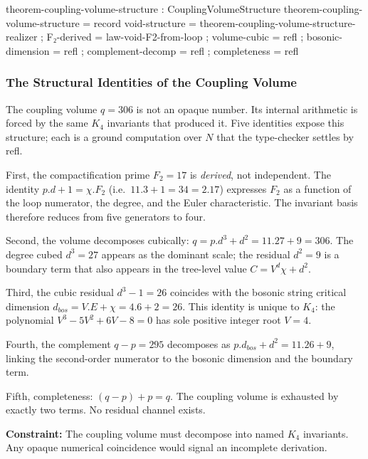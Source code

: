 \documentclass[11pt,a4paper]{book}
\def\cdot{.}%
\def\mathrm#1{#1}%
\def\mathbb#1{#1}%
\def\texttt#1{#1}%
\begin{document}
\begin{code}
theorem-coupling-volume-structure : CouplingVolumeStructure
theorem-coupling-volume-structure = record
  { void-structure    = theorem-coupling-volume-structure-realizer
  ; F₂-derived        = law-void-F2-from-loop
  ; volume-cubic       = refl
  ; bosonic-dimension  = refl
  ; complement-decomp  = refl
  ; completeness       = refl
  }
\end{code}

\subsubsection*{The Structural Identities of the Coupling Volume}

The coupling volume $q = 306$ is not an opaque number.  Its internal
arithmetic is forced by the same $K_4$ invariants that produced it.
Five identities expose this structure; each is a ground computation
over $\mathbb{N}$ that the type-checker settles by \texttt{refl}.

First, the compactification prime $F_2 = 17$ is \emph{derived}, not
independent.  The identity $p \cdot d + 1 = \chi \cdot F_2$ (i.e.\
$11 \cdot 3 + 1 = 34 = 2 \cdot 17$) expresses $F_2$ as a function of
the loop numerator, the degree, and the Euler characteristic.  The
invariant basis therefore reduces from five generators to four.

Second, the volume decomposes cubically: $q = p \cdot d^3 + d^2 =
11 \cdot 27 + 9 = 306$.  The degree cubed $d^3 = 27$ appears as the
dominant scale; the residual $d^2 = 9$ is a boundary term that also
appears in the tree-level value $C = V^d \chi + d^2$.

Third, the cubic residual $d^3 - 1 = 26$ coincides with the bosonic
string critical dimension $d_{\mathrm{bos}} = V \cdot E + \chi =
4 \cdot 6 + 2 = 26$.  This identity is unique to $K_4$: the polynomial
$V^3 - 5V^2 + 6V - 8 = 0$ has sole positive integer root $V = 4$.

Fourth, the complement $q - p = 295$ decomposes as $p \cdot d_{\mathrm{bos}} + d^2
= 11 \cdot 26 + 9$, linking the second-order numerator to the bosonic
dimension and the boundary term.

Fifth, completeness: $(q - p) + p = q$.  The coupling volume is
exhausted by exactly two terms.  No residual channel exists.

\textbf{Constraint:}
The coupling volume must decompose into named $K_4$ invariants.
Any opaque numerical coincidence would signal an incomplete derivation.
\end{document}
